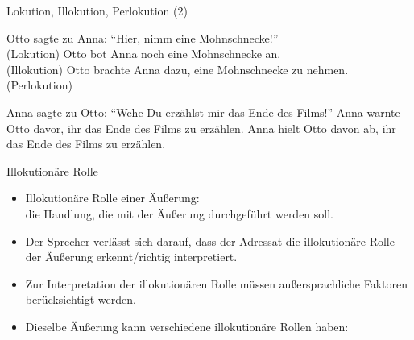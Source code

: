 \begin{frame}{Lokution, Illokution, Perlokution (2)}
\begin{exe}
\ex
\begin{xlist}
\ex Otto sagte zu Anna: "`Hier, nimm eine Mohnschnecke!"'\\
      (\alert{Lokution})
\ex Otto bot Anna noch eine Mohnschnecke an.\\
       (\alert{Illokution})
\ex Otto brachte Anna dazu, eine Mohnschnecke zu nehmen.
      (\alert{Perlokution})
\end{xlist}
\end{exe}
\pause

\begin{exe}
\ex
\begin{xlist}
\ex Anna sagte zu Otto: "`Wehe Du erzählst mir das Ende des Films!"'%
\ex Anna warnte Otto davor, ihr das Ende des Films zu erzählen.%
\ex Anna hielt Otto davon ab, ihr das Ende des Films zu erzählen.%
\end{xlist}
\end{exe}

\end{frame}





\begin{frame}{Illokutionäre Rolle}
  \begin{itemize}[<+->]
  \item \alert{Illokutionäre Rolle} einer Äußerung:\\ die Handlung, die mit der Äußerung durchgeführt werden soll.
  \item Der Sprecher verlässt sich darauf, dass der Adressat die illokutionäre Rolle der Äußerung erkennt/richtig interpretiert.
  \item Zur Interpretation der illokutionären Rolle müssen außersprachliche Faktoren berücksichtigt werden.
  \item Dieselbe Äußerung kann verschiedene illokutionäre Rollen haben:
  \end{itemize}


\end{frame}





